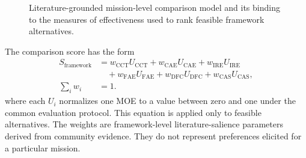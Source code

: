 \documentclass[11pt,a4paper]{article}
\begin{document}
\begin{figure}[htbp]
    \centering
    \resizebox{\linewidth}{!}{}
    \caption{Literature-grounded mission-level comparison model and its binding to the measures of effectiveness used to rank feasible framework alternatives.}
    \label{fig:framework-effectiveness-parametric}
\end{figure}

The comparison score has the form
\begin{equation}
    \begin{aligned}
        S_{\mathrm{framework}}
        &= w_{\mathrm{CCT}}U_{\mathrm{CCT}}
        + w_{\mathrm{CAE}}U_{\mathrm{CAE}}
        + w_{\mathrm{IRE}}U_{\mathrm{IRE}} \\
        &\quad + w_{\mathrm{FAE}}U_{\mathrm{FAE}}
        + w_{\mathrm{DFC}}U_{\mathrm{DFC}}
        + w_{\mathrm{CAS}}U_{\mathrm{CAS}}, \\
        \sum_i w_i &= 1.
    \end{aligned}
\end{equation}
where each $U_i$ normalizes one MOE to a value between zero and one under the common evaluation protocol. This equation is applied only to feasible alternatives. The weights are framework-level literature-salience parameters derived from community evidence. They do not represent preferences elicited for a particular mission.
\end{document}
